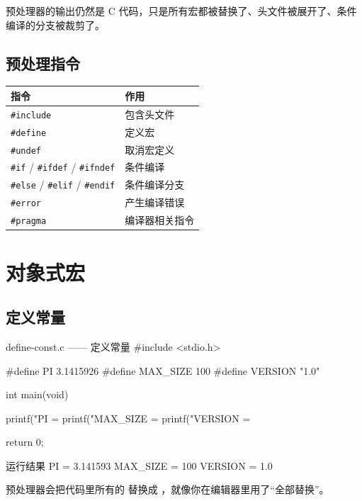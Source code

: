 预处理器的输出仍然是 C 代码，只是所有宏都被替换了、头文件被展开了、条件编译的分支被裁剪了。

\subsection{预处理指令}

\begin{center}
\begin{tabular}{@{}ll@{}}
\toprule
指令 & 作用 \\
\midrule
\texttt{\#include} & 包含头文件 \\
\texttt{\#define} & 定义宏 \\
\texttt{\#undef} & 取消宏定义 \\
\texttt{\#if} / \texttt{\#ifdef} / \texttt{\#ifndef} & 条件编译 \\
\texttt{\#else} / \texttt{\#elif} / \texttt{\#endif} & 条件编译分支 \\
\texttt{\#error} & 产生编译错误 \\
\texttt{\#pragma} & 编译器相关指令 \\
\bottomrule
\end{tabular}
\end{center}

\section{对象式宏}

\subsection{定义常量}

\begin{codebox}{define-const.c —— 定义常量}
#include <stdio.h>

#define PI 3.1415926
#define MAX_SIZE 100
#define VERSION "1.0"

int main(void)
{
    printf("PI = %
    printf("MAX_SIZE = %
    printf("VERSION = %

    return 0;
}
\end{codebox}

\begin{outbox}{运行结果}
PI = 3.141593
MAX_SIZE = 100
VERSION = 1.0
\end{outbox}

预处理器会把代码里所有的  替换成 ，就像你在编辑器里用了“全部替换”。

